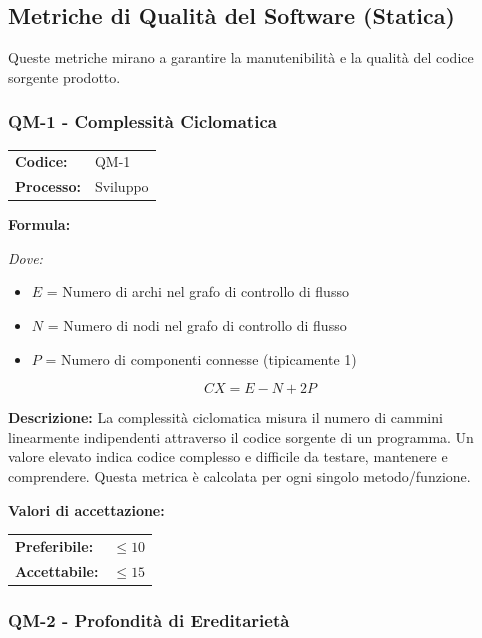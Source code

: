 \documentclass[a4paper,11pt,oneside]{scrartcl}
\begin{document}
\subsection{Metriche di Qualità del Software (Statica)}
Queste metriche mirano a garantire la manutenibilità e la qualità del codice sorgente prodotto.

\subsubsection{QM-1 - Complessità Ciclomatica}

\noindent
\begin{tabular}{@{}p{}p{}@{}}
\textbf{Codice:} & QM-1 \\
\textbf{Processo:} & Sviluppo \\
\end{tabular}

\vspace{0.3cm}
\noindent\textbf{Formula:}

\noindent\textit{Dove:}
\begin{itemize}[leftmargin=1.5cm, topsep=0pt, itemsep=0pt]
    \item $E$ = Numero di archi nel grafo di controllo di flusso
    \item $N$ = Numero di nodi nel grafo di controllo di flusso
    \item $P$ = Numero di componenti connesse (tipicamente 1)
\end{itemize}

\[
CX = E - N + 2P
\]

\noindent\textbf{Descrizione:} La complessità ciclomatica misura il numero di cammini linearmente indipendenti attraverso il codice sorgente di un programma. Un valore elevato indica codice complesso e difficile da testare, mantenere e comprendere. Questa metrica è calcolata per ogni singolo metodo/funzione.

\vspace{0.2cm}
\noindent\textbf{Valori di accettazione:}
\vspace{0.1cm}

\noindent
\begin{tabular}{@{}ll@{}}
\textbf{Preferibile:} & $\le 10$ \\
\textbf{Accettabile:} & $\le 15$ \\
\end{tabular}

\subsubsection{QM-2 - Profondità di Ereditarietà}
\end{document}
